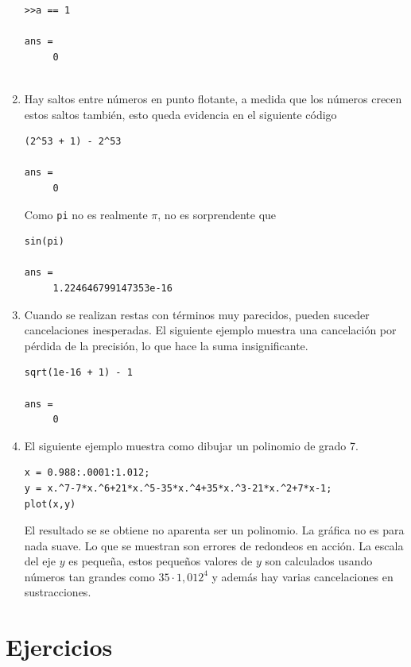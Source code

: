 \documentclass[12pt,letterpaper]{article}
\begin{document}
\begin{enumerate}
\begin{verbatim}
>>a == 1

ans =
     0
     
\end{verbatim}

\item Hay saltos entre n\'umeros en punto flotante, a medida que los n\'umeros crecen estos saltos tambi\'en, esto queda evidencia en el siguiente c\'odigo

\begin{verbatim}
(2^53 + 1) - 2^53

ans =
     0
\end{verbatim}

Como \texttt{pi} no es realmente $\pi$, no es sorprendente que 

\begin{verbatim}
sin(pi)

ans =
     1.224646799147353e-16
\end{verbatim}

\item Cuando se realizan restas con t\'erminos muy parecidos, pueden suceder cancelaciones inesperadas. El siguiente ejemplo 
muestra una cancelaci\'on por p\'erdida de la precisi\'on, lo que hace la suma insignificante. 

\begin{verbatim}
sqrt(1e-16 + 1) - 1

ans =
     0
\end{verbatim}

\item El siguiente ejemplo muestra como dibujar un polinomio de grado 7.

\begin{verbatim}
x = 0.988:.0001:1.012;
y = x.^7-7*x.^6+21*x.^5-35*x.^4+35*x.^3-21*x.^2+7*x-1;
plot(x,y)
\end{verbatim}

El resultado se se obtiene no aparenta ser un polinomio. La gr\'afica no es para nada suave. Lo 
que se muestran son errores de redondeos en acci\'on. La escala del eje $y$ es pequeña, estos pequeños valores de $y$ 
son calculados usando n\'umeros tan grandes como $35 \cdot 1,012^4$  y adem\'as hay varias cancelaciones en sustracciones.

\end{enumerate}

\section{\textbf{Ejercicios}}
\end{document}
